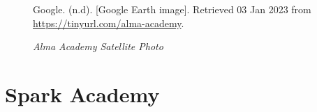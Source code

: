 \begin{figure}[hbtp]
    \caption[Alma Academy Satellite Photo]{\textit{Alma Academy Satellite Photo}}%
    \label{fig:alma-academy-sat-photo}
    {Google. (n.d). [Google Earth image]. Retrieved 03 Jan 2023 from \url{https://tinyurl.com/alma-academy}.}
\end{figure}


\clearpage
\section{Spark Academy}\label{sec:spark-academy-info}\indent

